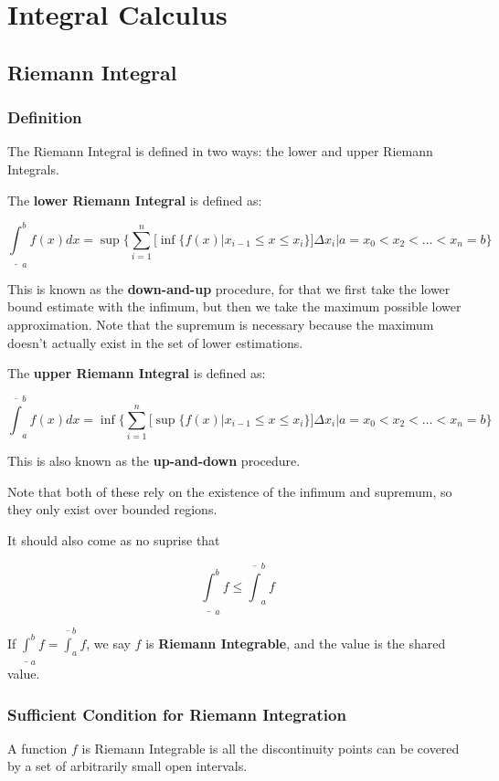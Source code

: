 \documentclass[11 pt, twoside]{article}
\begin{document}
\section{Integral Calculus}
\subsection{Riemann Integral}

\subsubsection{Definition}
The Riemann Integral is defined in two ways: the lower and upper Riemann
Integrals.

The \textbf{lower Riemann Integral} is defined as:

$$\underline{\int}_a^b f(x) dx = \sup \{ \sum_{i=1}^n [\inf\{ f(x) | x_{i-1} \leq x \leq
x_i\}] \Delta x_i | a = x_0 < x_2 < \dots < x_n = b\}$$

This is known as the \textbf{down-and-up} procedure, for that we first take the
lower bound estimate with the infimum, but then we take the maximum possible
lower approximation. Note that the supremum is necessary because the maximum
doesn't actually exist in the set of lower estimations.

The \textbf{upper Riemann Integral} is defined as:

$$\overline{\int}_a^b f(x) dx = \inf \{ \sum_{i=1}^n [\sup\{ f(x) | x_{i-1} \leq x \leq
x_i\}] \Delta x_i | a = x_0 < x_2 < \dots < x_n = b\}$$

This is also known as the \textbf{up-and-down} procedure.

Note that both of these rely on the existence of the infimum and supremum, so
they only exist over bounded regions.

It should also come as no suprise that

$$\underline{\int}_a^b f \leq \overline{\int}_a^b f$$

If $\underline{\int}_a^b f = \overline{\int}_a^b f$, we say $f$ is \textbf{Riemann
Integrable}, and the value is the shared value.

\subsubsection{Sufficient Condition for Riemann Integration}
A function $f$ is Riemann Integrable is all the discontinuity points can be
covered by a set of arbitrarily small open intervals.
\end{document}
